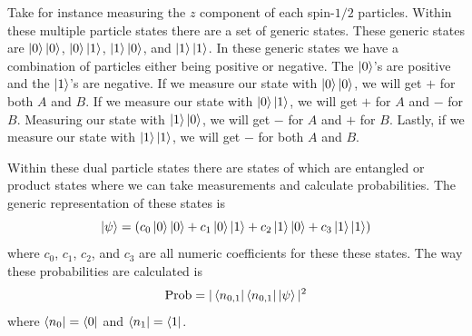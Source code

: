 \documentclass[twocolumn]{article}
\begin{document}
Take for instance measuring the $z$ component of each spin-$1/2$ particles. Within these multiple particle states there are a set of generic states. These generic states are $\ket{0}\ket{0}$, $\ket{0}\ket{1}$, $\ket{1}\ket{0}$, and $\ket{1}\ket{1}$. In these generic states we have a combination of particles either being positive or negative. The $\ket{0}$'s are positive and the $\ket{1}$'s are negative. If we measure our state with $\ket{0}\ket{0}$, we will get $+$ for both $A$ and $B$. If we measure our state with $\ket{0}\ket{1}$, we will get $+$ for $A$ and $-$ for $B$. Measuring our state with $\ket{1}\ket{0}$, we will get $-$ for $A$ and $+$ for $B$. Lastly, if we measure our state with $\ket{1}\ket{1}$, we will get $-$ for both $A$ and $B$.

Within these dual particle states there are states of which are entangled or product states where we can take measurements and calculate probabilities. The generic representation of these states is
\begin{equation}\label{eq:8}
\ket{\psi}=(c_0\ket{0}\ket{0}+c_1\ket{0}\ket{1}+c_2\ket{1}\ket{0}+c_3\ket{1}\ket{1})
\end{equation}
where $c_0$, $c_1$, $c_2$, and $c_3$ are all numeric coefficients for these these states. The way these probabilities are calculated is
\begin{equation}\label{eq:9}
\text{Prob}=|\bra{n_{0,1}}\bra{n_{0,1}}\ket{\psi}|^2
\end{equation}
where $\bra{n_0}=\bra{0}$ and $\bra{n_1}=\bra{1}$. 
\end{document}
